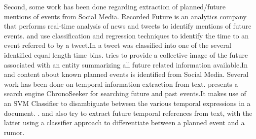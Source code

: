 Second, some work has been done regarding extraction of planned/future mentions of events from Social Media. Recorded Future\cite{recordedFuture} is an analytics company that performs real-time analysis of news and tweets to identify mentions of future events.\cite{tops2013predicting} and \cite{bosch2013estm} use classification and regression techniques to identify the time to an event referred to by a tweet.In \cite{tops2013predicting} a tweet was classified into one of the several identified equal length time bins. \cite{Jatowt:2011:ECE} tries to provide a collective image of the future associated with an entity summarizing all future related information available.In \cite{Becker:2012:ICP} and \cite{Becker_automaticidentification} content about known planned events is identified from Social Media. \iffalse \sathappanc{we do it on-line and focus mainly on planned protest and do it in multiple sources} \fi
Several work has been done on temporal information extraction from text.
\cite{Kawai:2010:CSE} presents a search engine ChronoSeeker for searching future and past events.It makes use of an SVM Classifier to disambiguate between the various temporal expressions in a document. .\cite{baeza2005searching} and \cite{dias2011future} also try to extract future temporal references from text, with the latter using a classifier approach to differentiate between a planned event and a rumor.\iffalse \sathappanc{Also cite TEMPEX, TIMEN etc} \fi
